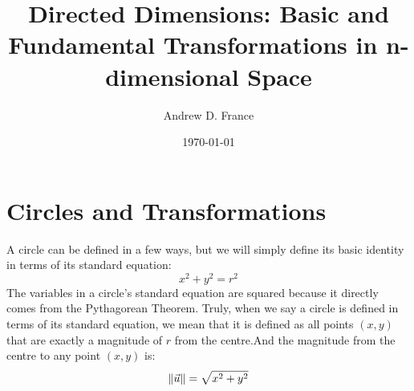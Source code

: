 \documentclass[12pt, letterpaper]{article}
\title{Directed Dimensions: Basic and Fundamental Transformations in n-dimensional Space}
\author{Andrew D. France}
\date{\today}
\newcommand{\Lr}{\(r\) }
\newcommand{\xy}{\((x,y)\) }
\begin{document}
	
	\maketitle
	\newpage
	
	\tableofcontents
	\newpage

	\section{Circles and Transformations}
	A circle can be defined in a few ways, but we will simply define its basic identity in terms of its standard equation:
	\begin{equation*}
		x^2 + y^2 = r^2
	\end{equation*}
	The variables in a circle's standard equation are squared because it directly comes from the Pythagorean Theorem. Truly, when we say a circle is defined in terms of its standard equation, we mean that it is defined as all points \xy that are exactly a magnitude of \Lr from the centre.\ftA And the magnitude from the centre to any point \xy is:
	\begin{equation*}
		\left\lVert\vec{u}\right\rVert=\sqrt{x^{2}+y^{2}}
	\end{equation*}
	
\end{document}
